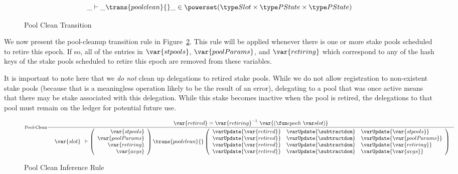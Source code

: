 \begin{figure}[htb]
  \begin{equation*}
    \_ \vdash \_ \trans{poolclean}{} \_ \in
    \powerset (\Slot \times \PState \times \PState)
  \end{equation*}
  \caption{Pool Clean Transition}
  \label{fig:ts-types:pool-clean}
\end{figure}


We now present the pool-cleanup transition rule in Figure~\ref{fig:rules:pool-clean}.
This rule will be applied whenever there is one or more stake pools scheduled
to retire this epoch. If so, all of the entries in $\var{stpools}$,
$\var{poolParams}$, and $\var{retiring}$ which correspond to any of the hash keys
of the stake pools scheduled to retire this epoch are removed from
these variables.

It is important to note here that we \textit{do not} clean up delegations to
retired stake pools. While we do not allow registration to non-existent
stake pools (because that is a meaningless operation likely to be the result
of an error), delegating to a pool that was once active means that there may
be stake associated with this delegation. While this stake becomes inactive when
the pool is retired, the delegations to that pool must remain on the ledger
for potential future use.

\begin{figure}[htb]
  \begin{equation}\label{eq:pool-clean}
    \inference[Pool-Clean]
    {
      \var{retired} = \var{retiring}^{-1}~\var{(\epoch{slot})}
    }
    {
      \begin{array}{l}
        \var{slot}\\
      \end{array}
      \vdash
      \left(
        \begin{array}{r}
          \var{stpools} \\
          \var{poolParams} \\
          \var{retiring} \\
          \var{avgs} \\
        \end{array}
      \right)
      \trans{poolclean}{}
      \left(
        \begin{array}{rcl}
          \varUpdate{\var{retired}} & \varUpdate{\subtractdom} & \varUpdate{\var{stpools}} \\
          \varUpdate{\var{retired}} & \varUpdate{\subtractdom} & \varUpdate{\var{poolParams}} \\
          \varUpdate{\var{retired}} & \varUpdate{\subtractdom} & \varUpdate{\var{retiring}} \\
          \varUpdate{\var{retired}} & \varUpdate{\subtractdom} & \varUpdate{\var{avgs}} \\
        \end{array}
      \right)
    }
  \end{equation}
  \caption{Pool Clean Inference Rule}
  \label{fig:rules:pool-clean}
\end{figure}

